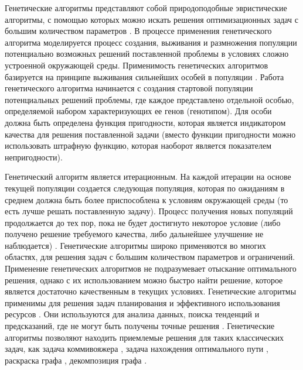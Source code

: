 Генетические алгоритмы представляют собой природоподобные эвристические алгоритмы, с помощью которых можно искать решения оптимизационных задач с большим количеством параметров \cite{Chahar2021Gen,Wirayanti2025Gen}.
В процессе применения генетического алгоритма моделируется процесс создания, выживания и размножения популяции потенциально возможных решений поставленной проблемы в условиях сложно устроенной окружающей среды.
Применимость генетических алгоритмов базируется на принципе выживания сильнейших особей в популяции \cite{Naaman2025Gen}.
Работа генетического алгоритма начинается с создания стартовой популяции потенциальных решений проблемы, где каждое представлено отдельной особью, определяемой набором характеризующих ее генов (генотипом).
Для особи должна быть определена функция пригодности, которая является индикатором качества для решения поставленной задачи (вместо функции пригодности можно использовать штрафную функцию, которая наоборот является показателем непригодности). 

Генетический алгоритм является итерационным.
На каждой итерации на основе текущей популяции создается следующая популяция, которая по ожиданиям в среднем должна быть более приспособлена к условиям окружающей среды (то есть лучше решать поставленную задачу).
Процесс получения новых популяций продолжается до тех пор, пока не будет достигнуто некоторое условие (либо получено решение требуемого качества, либо дальнейшее улучшение не наблюдается) \cite{Charilogis2024Gen}.
Генетические алгоритмы широко применяются во многих областях, для решения задач с большим количеством параметров и ограничений.
Применение генетических алгоритмов не подразумевает отыскание оптимального решения, однако с их использованием можно быстро найти решение, которое является достаточно качественным в текущих условиях.
Генетические алгоритмы применимы для решения задач планирования \cite{Dawei2025Gen} и эффективного использования ресурсов \cite{Fang2025Gen,Mahmood2024Gen}.
Они используются для анализа данных, поиска тенденций и предсказаний, где не могут быть получены точные решения \cite{Kangra2024Gen,Sangeetha2025Gen}.
Генетические алгоритмы позволяют находить приемлемые решения для таких классических задач, как задача коммивояжера \cite{Kralev2024Gen}, задача нахождения оптимального пути \cite{Bogdanov2023Gen}, раскраска графа \cite{Malhotra2024Graph}, декомпозиция графа \cite{Chaouche2023Graph,Li2020Graph}.

